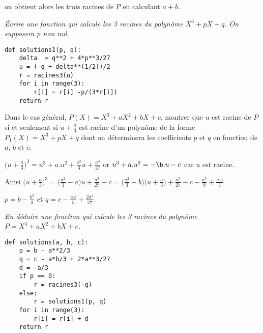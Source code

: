on obtient alors les trois racines de $P$ en calculant $a+b$.
\begin{Exercise}
\it Écrire une fonction  qui calcule les 3 racines du polynôme $X^3+pX+q$. On supposera $p$ non nul.
\end{Exercise}
\begin{Answer}
\begin{lstlisting}
def solutions1(p, q):
    delta  = q**2 + 4*p**3/27
    u = (-q + delta**(1/2))/2
    r = racines3(u)
    for i in range(3):
        r[i] = r[i] -p/(3*r[i])
    return r
\end{lstlisting}
\end{Answer}
\begin{Exercise}
 Dans le cas général, $P(X)=X^3+a X^2+ b X+ c$, montrer que $u$ est racine de $P$ si et seulement si $u+\frac a 3$ est racine d'un polynôme de la forme $P_1(X)=X^3+pX+q$ dont on déterminera les coefficients $p$ et $q$ en fonction de $a$, $b$  et $c$.
\end{Exercise}
\begin{Answer}

$\bigl(u+\frac a 3\bigr)^3 = u^3+a.u^2+\frac {a^2}3u+\frac {a^3}{27}$ or $u^3+a.u^2 = -\b.u-c$ car $u$ est racine.

Ainsi $\bigl(u+\frac a 3\bigr)^3 = \bigl(\frac {a^2}3 - a)u+\frac {a^3}{27}-c
=\bigl(\frac {a^2}3 - b)\bigl(u+\frac a3\bigr)+\frac {a^3}{27}-c-\frac {a^3}9+\frac{a.b}3$.

$p = b - \frac {b^2}3$ et $q = c - \frac{a.b}3+\frac {2a^3}{27}$.
\end{Answer}
\begin{Exercise}
\it En déduire une fonction  qui calcule les 3 racines du  polynôme $P = X^3 + aX^2+ bX + c$.
\end{Exercise}
\begin{Answer}
\begin{lstlisting}
def solutions(a, b, c):
    p = b - a**2/3
    q = c - a*b/3 + 2*a**3/27
    d = -a/3
    if p == 0:
        r = racines3(-q)
    else:
        r = solutions1(p, q)
    for i in range(3):
        r[i] = r[i] + d
    return r 
\end{lstlisting}
\newpage
\end{Answer}
